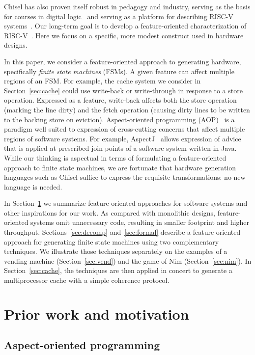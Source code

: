 \documentclass[sigplan,anonymous,review]{acmart}
\begin{document}
Chisel has also proven itself robust in pedagogy and industry, serving as the basis for courses in digital logic~\cite{vlsicourse} and serving as a platform for describing RISC-V systems~\cite{chisel:riscv}.  Our long-term goal is to develop a feature-oriented characterization of RISC-V~\cite{riscv}.  Here we focus on a specific, more modest construct used in hardware designs.

In this paper, we consider a feature-oriented approach to generating hardware, specifically \emph{finite state machines} (FSMs). A given feature can affect multiple regions of an FSM. For example, the cache system  we consider in Section~\ref{sec:cache} could use write-back or write-through in response to a store operation. Expressed as a feature, write-back affects both the store operation (marking the line dirty) and the fetch operation (causing dirty lines to be written to the backing store on eviction). Aspect-oriented programming (AOP)~\cite{gregor:97} is a paradigm well suited to expression of cross-cutting concerns that affect multiple regions of software systems. For example, AspectJ~\cite{aspectj} allows expression of advice that is applied at prescribed join points of a software system written in Java. While our thinking is aspectual in terms of formulating a feature-oriented approach to finite state machines, we are fortunate that hardware generation languages such as Chisel suffice to express the requisite transformations:  no new language is needed.

In Section~\ref{sec:prior} we summarize feature-oriented approaches for software systems and other inspirations for our work. As compared with monolithic designs, feature-oriented systems omit unnecessary code, resulting in smaller footprint and higher throughput.
Sections~\ref{sec:decomp} and~\ref{sec:formal} describe a feature-oriented approach for generating finite state machines using two complementary techniques. We illustrate those techniques separately on the examples of a vending machine (Section~\ref{sec:vend}) and the game of Nim (Section~\ref{sec:nim}). In Section~\ref{sec:cache}, the techniques are then applied in concert to generate a multiprocessor cache with a simple coherence protocol.

\section{Prior work and motivation}\label{sec:prior}

\subsection{Aspect-oriented programming}
\end{document}
